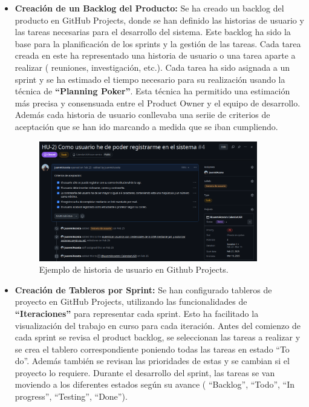\begin{itemize}
    \item \textbf{Creación de un Backlog del Producto:} Se ha creado un backlog del producto en GitHub Projects, donde se han definido las historias de usuario y las tareas necesarias para el desarrollo del sistema. Este backlog ha sido la base para la planificación de los sprints y la gestión de las tareas.
    \newline\newline
    Cada tarea creada en este ha representado una historia de usuario o una tarea aparte a realizar ( reuniones, investigación, etc.). Cada tarea ha sido asignada a un sprint y se ha estimado el tiempo necesario para su realización usando la técnica de \textbf{``Planning Poker''}. Esta técnica ha permitido una estimación más precisa y consensuada entre el Product Owner y el equipo de desarrollo.
    Además cada historia de usuario conllevaba una seriie de criterios de aceptación que se han ido marcando a medida que se iban cumpliendo. 
    
    \begin{figure}[H] 
        \centering 
        \includegraphics[width=0.9\textwidth]{figures/05_hu.png}
        \caption{Ejemplo de historia de usuario en Github Projects.} %
        \label{historia de usuario} %
    \end{figure}

    \item \textbf{Creación de Tableros por Sprint:} Se han configurado tableros de proyecto en GitHub Projects, utilizando las funcionalidades de \textbf{``Iteraciones''} para representar cada sprint. Esto ha facilitado la visualización del trabajo en curso para cada iteración.
    \newline
    Antes del comienzo de cada sprint se revisa el product backlog, se seleccionan las tareas a realizar y se crea el tablero correspondiente poniendo todas las tareas en estado ``To do''. Además también se revisan las prioridades de estas y se cambian si el proyecto lo requiere.
    Durante el desarrollo del sprint, las tareas se van moviendo a los diferentes estados según su avance ( ``Backlog'', ``Todo'', ``In progress'', ``Testing'', ``Done'').
    

\end{itemize}
